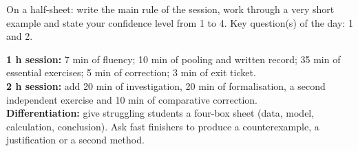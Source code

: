 \begin{exitticket}[3 minutes]On a half-sheet: write the main rule of the session, work through a very short example and state your confidence level from 1 to 4. Key question(s) of the day: 1 and 2.\end{exitticket}

\ifmxteacher
\begin{method}
\textbf{1 h session:} 7 min of fluency; 10 min of pooling and written record; 35 min of essential exercises; 5 min of correction; 3 min of exit ticket.\\
\textbf{2 h session:} add 20 min of investigation, 20 min of formalisation, a second independent exercise and 10 min of comparative correction.\\
\textbf{Differentiation:} give struggling students a four-box sheet (data, model, calculation, conclusion). Ask fast finishers to produce a counterexample, a justification or a second method.
\end{method}
\fi
